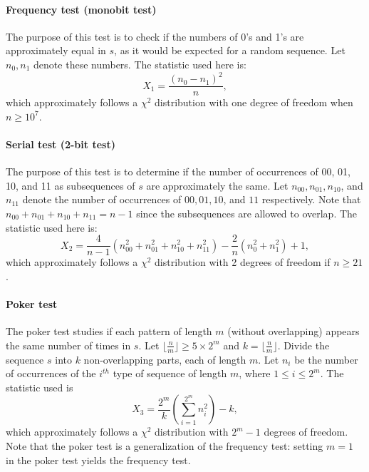 \documentclass[journal]{IEEEtran}
\begin{document}
\paragraph{Frequency test (monobit test)}
The purpose of this test is to check if the numbers of 0's and 1's are approximately equal in $s$, as it would be expected for a random sequence. Let $n_0, n_1$ denote these numbers. The statistic used here is:
\begin{equation*}
 X_1=\frac{(n_0-n_1)^2}{n}, 
\end{equation*}
\noindent which approximately follows a $\chi^2$ distribution with one degree of freedom when $n\geqslant 10^7$.

\paragraph{Serial test (2-bit test)}
The purpose of this test is to determine if the number of occurrences of 00, 01, 10, and 11 as subsequences of $s$ are approximately the same. Let $n_{00} , n_{01} ,n_{10}$, and $n_{11}$ denote the number of occurrences of $00, 01, 10$, and $11$ respectively. Note that $n_{00} + n_{01} + n_{10} + n_{11} = n-1$ since the subsequences are allowed to overlap. The
statistic used here is:
\begin{equation*}
X_2=\frac{4}{n-1}(n_{00}^2+n_{01}^2+n_{10}^2+n_{11}^2)-\frac{2}{n}(n_0^2+n_1^2)+1,
\end{equation*}
\noindent which approximately follows a $\chi^2$ distribution with 2 degrees of freedom if $n\geqslant 21$.

\paragraph{Poker test}
The poker test studies if each pattern of length $m$ (without overlapping) appears the same number of times in $s$. Let $\lfloor \frac{n}{m} \rfloor\geqslant 5 \times 2^m$ and $k= \lfloor \frac{n}{m} \rfloor $. Divide the sequence $s$ into $k$ non-overlapping parts, each of length $m$. Let $n_i$ be the number of occurrences of the $i^{th}$ type of sequence of length $m$, where $1 \leqslant i \leqslant 2^m$. The statistic used is
\begin{equation*}
X_3=\dfrac{2^m}{k}\left(\displaystyle{\sum^{2^m}_{i=1}n^2_i}\right)-k,
\end{equation*}
which approximately follows a $\chi^2$ distribution with $2^m-1$ degrees of freedom. Note that the poker test is a generalization of the frequency test: setting $m = 1$ in the poker test yields the frequency test.
\end{document}
